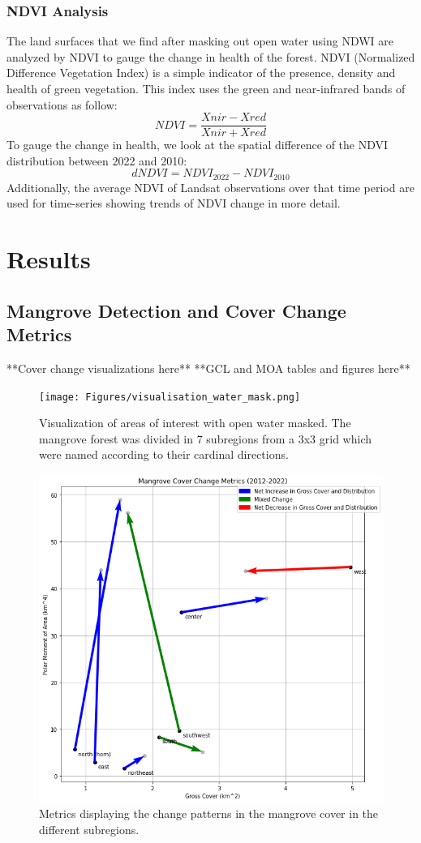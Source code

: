 \documentclass[journal,article,submit,pdftex,moreauthors]{Definitions/mdpi}
\begin{document}
\subsubsection{NDVI Analysis}
The land surfaces that we find after masking out open water using NDWI are analyzed by NDVI to gauge the change in health of the forest. NDVI (Normalized Difference Vegetation Index) is a simple indicator of the presence, density and health of green vegetation. This index uses the green and near-infrared bands of observations as follow:
\[NDVI = \frac{Xnir - Xred}{Xnir + Xred}\]
To gauge the change in health, we look at the spatial difference of the NDVI distribution between 2022 and 2010:
\[dNDVI = NDVI_{2022} - NDVI_{2010}\]
Additionally, the average NDVI of Landsat observations over that time period are used for time-series showing trends of NDVI change in more detail.
\section{Results}
\subsection{Mangrove Detection and Cover Change Metrics}
**Cover change visualizations here**
**GCL and MOA tables and figures here**

\begin{figure}[H]
\texttt{[image: Figures/visualisation\_water\_mask.png]}
\caption{Visualization of areas of interest with open water masked. The mangrove forest was divided in 7 subregions from a 3x3 grid which were named according to their cardinal directions.\label{fig1}}
\end{figure}  

\begin{figure}[H]
\includegraphics[width=13.5 cm]{Figures/mangrove_change_metric.png}
\caption{Metrics displaying the change patterns in the mangrove cover in the different subregions. \label{fig2}}
\end{figure}  
\end{document}
